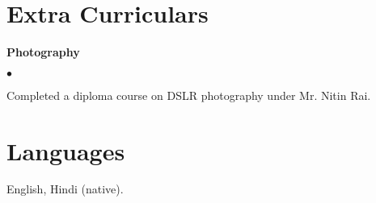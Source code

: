 \documentclass[margin,line]{res}
\newenvironment{list2}{
  \begin{list}{$\bullet$}{%
      \setlength{\itemsep}{0in}
      \setlength{\parsep}{0in} \setlength{\parskip}{0in}
      \setlength{\topsep}{0in} \setlength{\partopsep}{0in} 
      \setlength{\leftmargin}{0.2in}}}{\end{list}}
\begin{document}
\begin{resume}
\section{\sc Extra Curriculars}

{\bf Photography}

\vspace*{.2cm}
\begin{list2}
\item Completed a diploma course on DSLR photography under Mr. Nitin Rai.
\end{list2}

\section{\sc Languages}

English, Hindi (native).



\end{resume}
\end{document}
